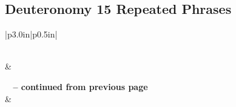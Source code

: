 \subsection{Deuteronomy 15 Repeated Phrases}


\normalsize
 
\begin{center}
\begin{longtable}{|p{3.0in}|p{0.5in}|}
\caption[Deuteronomy 15 Repeated Phrases]{Deuteronomy 15 Repeated Phrases}\label{table:Repeated Phrases Deuteronomy 15} \\
\hline {} &  \\ \hline 
\endfirsthead
 
{{\bfseries \tablename\ \thetable{} -- continued from previous page}} \\  
\hline {} &  \\ \hline 
\endhead
 

\end{longtable}
\end{center}
